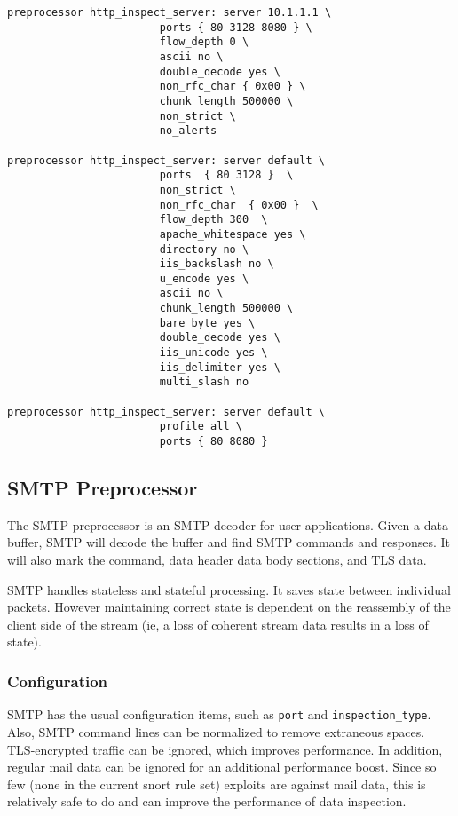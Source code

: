 \documentclass[english]{report}
\begin{document}
\begin{verbatim}
preprocessor http_inspect_server: server 10.1.1.1 \
                        ports { 80 3128 8080 } \
                        flow_depth 0 \
                        ascii no \
                        double_decode yes \
                        non_rfc_char { 0x00 } \
                        chunk_length 500000 \
                        non_strict \
                        no_alerts

preprocessor http_inspect_server: server default \ 
                        ports  { 80 3128 }  \
                        non_strict \
                        non_rfc_char  { 0x00 }  \
                        flow_depth 300  \
                        apache_whitespace yes \
                        directory no \
                        iis_backslash no \
                        u_encode yes \
                        ascii no \
                        chunk_length 500000 \
                        bare_byte yes \
                        double_decode yes \
                        iis_unicode yes \ 
                        iis_delimiter yes \
                        multi_slash no

preprocessor http_inspect_server: server default \
                        profile all \
                        ports { 80 8080 }
\end{verbatim}

\subsection{SMTP Preprocessor\label{SMTP}}

The SMTP preprocessor is an SMTP decoder for user applications.  Given a data buffer,
SMTP will decode the buffer and find SMTP commands and responses.
It will also mark the command, data header data body sections, and TLS data.

SMTP handles stateless and stateful processing.  It saves state
between individual packets.  However maintaining correct state is
dependent on the reassembly of the client side of the stream (ie, a
loss of coherent stream data results in a loss of state).

\subsubsection{Configuration}

SMTP has the usual configuration items, such as \texttt{port} and \texttt{inspection\_type}.
Also, SMTP command lines can be normalized to remove extraneous spaces.
TLS-encrypted traffic can be ignored, which improves performance.  In addition,
regular mail data can be ignored for an additional performance boost.  Since
so few (none in the current snort rule set) exploits are against mail data,
this is relatively safe to do and can improve the performance of data
inspection.
\end{document}
